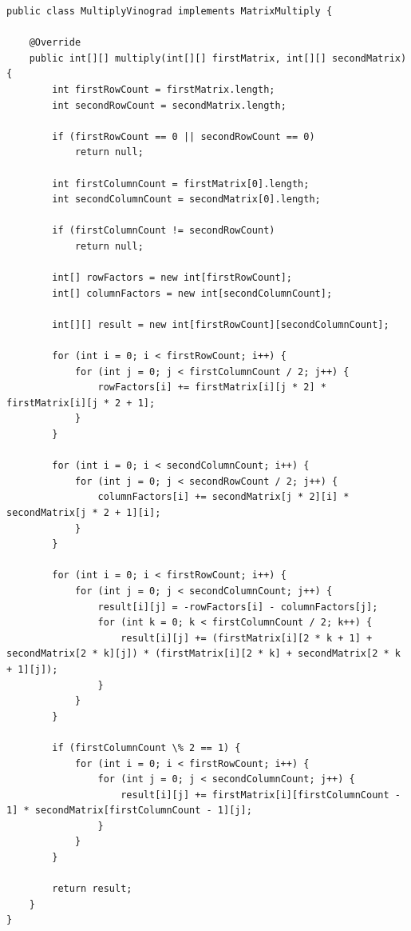 \documentclass[12pt]{report}
\begin{document}
\begin{lstlisting}[label=some-code,caption=Алгоритм Винограда]
public class MultiplyVinograd implements MatrixMultiply {
   
    @Override
    public int[][] multiply(int[][] firstMatrix, int[][] secondMatrix) {
        int firstRowCount = firstMatrix.length;
        int secondRowCount = secondMatrix.length;

        if (firstRowCount == 0 || secondRowCount == 0)
            return null;

        int firstColumnCount = firstMatrix[0].length;
        int secondColumnCount = secondMatrix[0].length;

        if (firstColumnCount != secondRowCount)
            return null;

        int[] rowFactors = new int[firstRowCount];
        int[] columnFactors = new int[secondColumnCount];

        int[][] result = new int[firstRowCount][secondColumnCount];

        for (int i = 0; i < firstRowCount; i++) {
            for (int j = 0; j < firstColumnCount / 2; j++) {
                rowFactors[i] += firstMatrix[i][j * 2] * firstMatrix[i][j * 2 + 1];
            }
        }

        for (int i = 0; i < secondColumnCount; i++) {
            for (int j = 0; j < secondRowCount / 2; j++) {
                columnFactors[i] += secondMatrix[j * 2][i] * secondMatrix[j * 2 + 1][i];
            }
        }

        for (int i = 0; i < firstRowCount; i++) {
            for (int j = 0; j < secondColumnCount; j++) {
                result[i][j] = -rowFactors[i] - columnFactors[j];
                for (int k = 0; k < firstColumnCount / 2; k++) {
                    result[i][j] += (firstMatrix[i][2 * k + 1] + secondMatrix[2 * k][j]) * (firstMatrix[i][2 * k] + secondMatrix[2 * k + 1][j]);
                }
            }
        }

        if (firstColumnCount \% 2 == 1) {
            for (int i = 0; i < firstRowCount; i++) {
                for (int j = 0; j < secondColumnCount; j++) {
                    result[i][j] += firstMatrix[i][firstColumnCount - 1] * secondMatrix[firstColumnCount - 1][j];
                }
            }
        }

        return result;
    }
}
\end{lstlisting}
\end{document}
